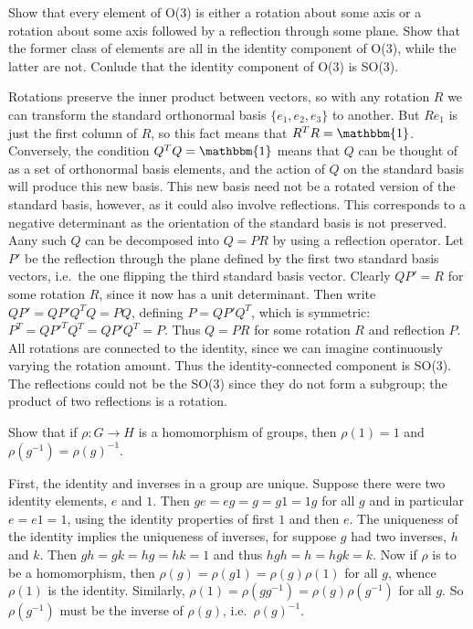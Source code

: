 \begin{p}%
{Show that every element of O(3) is either a rotation about some axis or a rotation about some axis followed by a reflection through some plane. Show that the former class of elements are all in the identity component of O(3), while the latter are not. Conlude that the identity component of O(3) is SO(3).}
\end{p}
{Rotations preserve the inner product between vectors, so with any rotation $R$ we can transform the standard orthonormal basis $\{e_1,e_2,e_3\}$ to another. But $Re_1$ is just the first column of $R$, so this fact means that $R^T R=\mathbbm{1}$. Conversely, the condition $Q^TQ=\mathbbm{1}$ means that $Q$ can be thought of as a set of orthonormal basis elements, and the action of $Q$ on the standard basis will produce this new basis. 
This new basis need not be a rotated version of the standard basis, however, as it could also involve reflections. This corresponds to a negative determinant as the orientation of the standard basis is not preserved. 
Aany such $Q$ can be decomposed into $Q=PR$ by using a reflection operator. Let $P'$ be the reflection through
the plane defined by the first two standard basis vectors, i.e.~the one flipping the third standard basis vector. Clearly $QP'=R$ for some rotation $R$, since it now has a unit determinant. Then write $QP'=QP'Q^TQ=PQ$,
defining $P=QP'Q^T$, which is symmetric: $P^T=QP'^TQ^T=QP'Q^T=P$. Thus $Q=PR$ for some rotation $R$ and reflection $P$. All rotations are connected to the identity, since we can imagine continuously varying the rotation amount. Thus the identity-connected component is SO(3). The reflections could not be the SO(3) since
they do not form a subgroup; the product of two reflections is a rotation.}

\begin{p}%
\end{p}

\begin{p}%
{Show that if $\rho:G\rightarrow H$ is a homomorphism of groups, then $\rho(1)=1$ and $\rho(g^{-1})=\rho(g)^{-1}$.}
\end{p}
{First, the identity and inverses in a group are unique. Suppose there were
two identity elements, $e$ and $1$. Then $ge=eg=g=g1=1g$ for all $g$ and in particular $e=e1=1$, using the
identity properties of first $1$ and then $e$. The uniqueness of the identity implies the uniqueness of inverses,
for suppose $g$ had two inverses, $h$ and $k$. Then $gh=gk=hg=hk=1$ and thus $hgh=h=hgk=k$.
Now if $\rho$ is to be a homomorphism, then $\rho(g)=\rho(g1)=\rho(g)\rho(1)$ for all $g$, whence $\rho(1)$ is
the identity. Similarly, $\rho(1)=\rho(gg^{-1})=\rho(g)\rho(g^{-1})$ for all $g$. So $\rho(g^{-1})$ must be 
the inverse of $\rho(g)$, i.e.~$\rho(g)^{-1}$.}

